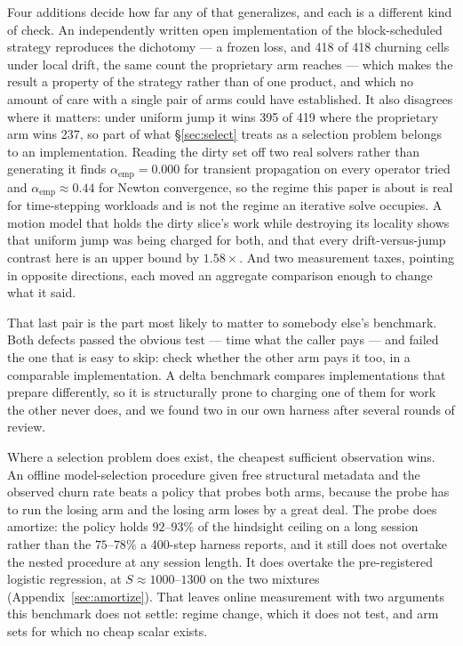 \documentclass{article}
\begin{document}
Four additions decide how far any of that generalizes, and each is a different
kind of check. An independently written open implementation of the
block-scheduled strategy reproduces the dichotomy --- a frozen loss, and 418 of
418 churning cells under local drift, the same count the proprietary arm reaches
--- which makes the result a property of the strategy rather than of one
product, and which no amount of care with a single pair of arms could have
established. It also disagrees where it matters: under uniform jump it wins 395
of 419 where the proprietary arm wins 237, so part of what \S\ref{sec:select}
treats as a selection problem belongs to an implementation. Reading the dirty
set off two real solvers rather than generating it finds
$\alpha_{\text{emp}} = 0.000$ for transient propagation on every operator tried
and $\alpha_{\text{emp}} \approx 0.44$ for Newton convergence, so the regime this
paper is about is real for time-stepping workloads and is not the regime an
iterative solve occupies. A motion model that holds the dirty slice's work while
destroying its locality shows that uniform jump was being charged for both, and
that every drift-versus-jump contrast here is an upper bound by $1.58\times$.
And two measurement taxes, pointing in opposite directions, each moved an
aggregate comparison enough to change what it said.

That last pair is the part most likely to matter to somebody else's benchmark.
Both defects passed the obvious test --- time what the caller pays --- and failed
the one that is easy to skip: check whether the other arm pays it too, in a
comparable implementation. A delta benchmark compares implementations that
prepare differently, so it is structurally prone to charging one of them for
work the other never does, and we found two in our own harness after several
rounds of review.

Where a selection problem does exist, the cheapest sufficient observation wins.
An offline model-selection procedure given free structural metadata and the
observed churn rate beats a policy that probes both arms, because the probe has
to run the losing arm and the losing arm loses by a great deal. The probe does
amortize: the policy holds $92$--$93\%$ of the hindsight ceiling on a long
session rather than the $75$--$78\%$ a 400-step harness reports, and it still does not overtake
the nested procedure at any session length. It does overtake the pre-registered
logistic regression, at $S \approx 1000$--$1300$ on the two mixtures
(Appendix~\ref{sec:amortize}).
That leaves online measurement with two arguments this benchmark does
not settle: regime change, which it does not test, and arm sets for which no
cheap scalar exists.
\end{document}
